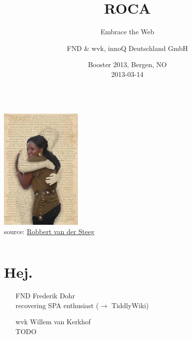\documentclass{beamer}
\date{Booster 2013, Bergen, NO \\ 2013-03-14}
\author{FND \& wvk, innoQ Deutschland GmbH}
\title{ROCA}
\subtitle{Embrace the Web}
\begin{document}
  {

  \begin{frame}[plain]
    \titlepage
  \end{frame}
}

\setcounter{tocdepth}{1}

\begin{frame}
  \begin{columns}
    \begin{column}{4.4cm}
      \includegraphics[width=4cm]{images/embrace.jpg}
      \\
      \tiny source: \href{http://www.flickr.com/photos/robbie73/4289385819/}{Robbert van der Steeg}
    \end{column}

    \begin{column}{6.6cm}
      \tableofcontents
    \end{column}
  \end{columns}
\end{frame}

\section{Hej.}

\begin{frame}{\insertsectionhead}
  \begin{itemize}
    \item[FND] Frederik Dohr \\
        recovering SPA enthusiast (\ensuremath{\rightarrow} TiddlyWiki)
    \item[]
    \item[wvk] Willem van Kerkhof \\
        TODO
  \end{itemize}

\end{frame}
\end{document}
